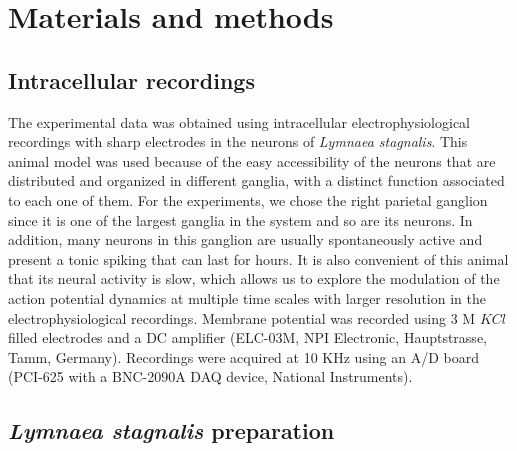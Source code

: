 
\section{Materials and methods}

\subsection{Intracellular recordings}
\label{Lymnaea stagnalis preparation}
The experimental data was obtained using intracellular electrophysiological recordings with sharp electrodes in the neurons of \textit{Lymnaea stagnalis}. This animal model was used because of the easy accessibility of the neurons that are distributed and organized in different ganglia, with a distinct function associated to each one of them. For the experiments, we chose the right parietal ganglion since it is one of the largest ganglia in the system and so are its neurons. In addition, many neurons in this ganglion are usually spontaneously active and present a tonic spiking that can last for hours. It is also convenient of this animal that its neural activity is slow, which allows us to explore the modulation of the action potential dynamics at multiple time scales with larger resolution in the electrophysiological recordings. Membrane potential was recorded using 3 M $KCl$ filled electrodes and a DC amplifier (ELC-03M, NPI Electronic, Hauptstrasse, Tamm, Germany). Recordings were acquired at 10 KHz using an A/D board (PCI-625 with a BNC-2090A DAQ device, National Instruments). 

\subsection{\textit{Lymnaea stagnalis} preparation}

